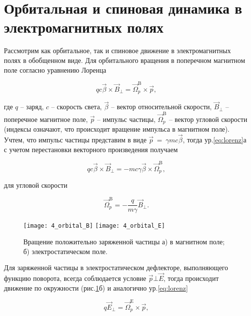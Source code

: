 \section{Орбитальная и спиновая динамика в электромагнитных полях}\label{sec:EDM/requirements/deflector}

\par Рассмотрим как орбитальное, так и спиновое движение в электромагнитных полях в обобщенном виде. Для орбитального вращения в поперечном магнитном поле согласно уравнению Лоренца

\begin{equation} 
qc\vec{\beta}\times{\vec{B}}_\bot={\vec{\Omega}}_p^{\textrm{B}}\times\vec{p},
\label{eq:lorenz}
\end{equation}

\noindent где $q$ -- заряд, $c$ -- скорость света, $\vec{\beta}$ -- вектор относительной скорости, ${\vec{B}}_\bot$ -- поперечное магнитное поле, $\vec{p}$ -- импульс частицы, ${\vec{\Omega}}_p^{\textrm{B}}$ -- вектор угловой скорости (индексы означают, что происходит вращение импульса в магнитном поле). Учтем, что импульс частицы представим в виде $\vec{p}\ =\ \gamma mc\vec{\beta}$, тогда ур.\ref{eq:lorenz}а с учетом перестановки векторного произведения получаем

\begin{equation}	
qc\vec{\beta}\times{\vec{B}}_\bot=-mc\gamma\vec{\beta}\times{\vec{\Omega}}_p^{\textrm{B}},
\end{equation}

\noindent для угловой скорости

\begin{equation} \label{eq:omega_pB}
 {\vec{\Omega}}_p^{\textrm{B}}=-\frac{q}{m\gamma}{\vec{B}}_\bot.
\end{equation} 

\begin{figure}[!h]
  \centering
	\texttt{[image: 4\_orbital\_B]}
	\texttt{[image: 4\_orbital\_E]}
   \caption{Вращение положительно заряженной частицы а) в магнитном поле; б) электростатическом поле.}
   \label{fig:4_orbital_B_E}
\end{figure}

\par Для заряженной частицы в электростатическом дефлекторе, выполняющего функцию поворота, всегда соблюдается условие $\vec{p} \bot \vec{E}$, тогда происходит движение по окружности (рис.\ref{fig:4_orbital_B_E}б) и аналогично ур.\ref{eq:lorenz}

\begin{equation}
q{\vec{E}}_\bot={\vec{\Omega}}_p^{\textrm{E}}\times\vec{p},
\end{equation} 

